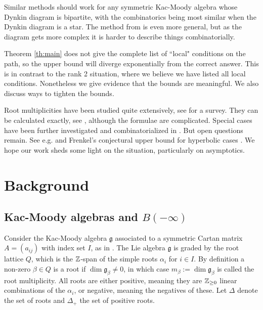 \documentclass{amsart}
\numberwithin{equation}{section}
\numberwithin{figure}{section}
\numberwithin{table}{section}
\theoremstyle{definition}
\newcommand{\g}{\mathfrak{g}}
\begin{document}
Similar methods should work for any symmetric Kac-Moody algebra whose Dynkin diagram is bipartite, with the combinatorics being most similar when the Dynkin diagram is a star. The method from \cite{T21} is even more general, but as the diagram gets more complex it is harder to describe things combinatorially. 

Theorem \ref{th:main} does not give the complete list of ``local" conditions on the path, so the upper bound will diverge exponentially from the correct answer. This is in contrast to the rank 2 situation, where we believe we have listed all local conditions. Nonetheless we give evidence that the bounds are meaningful. We also discuss ways to tighten the bounds.

Root multiplicities have been studied quite extensively, see \cite{CFL:2014} for a survey. They can be calculated exactly, see \cite{BM,Pete:rec}, although the formulae are complicated.
Special cases have been further investigated and combinatorialized in \cite{FF, KLL, KM95}. But open questions remain. See e.g. \cite[Open Problems 2 and 3]{CFL:2014} and Frenkel's conjectural upper bound for hyperbolic cases \cite{Frenkel-conj}. We hope our work sheds some light on the situation, particularly on asymptotics. 

\section{Background}

\subsection{Kac-Moody algebras and $B(-\infty)$}
Consider the Kac-Moody algebra $\mathfrak{g}$ associated to a symmetric Cartan matrix $A=(a_{ij})$ with index set $I$, as in \cite{Kac:1990}. The Lie algebra $\g$ is graded by the root lattice $Q$, which is the ${\Bbb Z}$-span of the simple roots $\alpha_i$ for $i \in I$. By definition a non-zero $\beta \in Q$ is a root if $\dim \g_\beta \neq 0$, in which case $m_\beta:= \dim \g_\beta $ is called the root multiplicity. All roots are either positive, meaning they are ${\Bbb Z}_{\geq 0}$ linear combinations of the $\alpha_i$, or negative, meaning the negatives of these. Let $\Delta$ denote the set of roots and $\Delta_+$ the set of positive roots.
\end{document}
